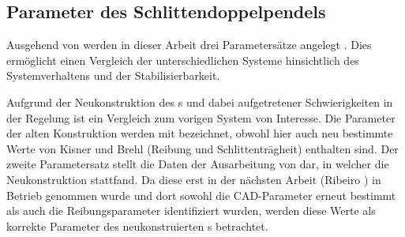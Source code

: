 \subsection{Parameter des Schlittendoppelpendels}\label{subsec:spdparams}

Ausgehend von  werden in dieser Arbeit drei Parametersätze angelegt .
Dies ermöglicht einen Vergleich der unterschiedlichen Systeme hinsichtlich des Systemverhaltens und der Stabilisierbarkeit.

Aufgrund der Neukonstruktion des \dpd s und dabei aufgetretener Schwierigkeiten in der Regelung ist ein Vergleich zum vorigen System von Interesse.
Die Parameter der alten Konstruktion werden mit  bezeichnet, obwohl hier auch neu bestimmte Werte von Kisner \cite{kisner} und Brehl \cite{brehl} (Reibung und Schlittenträgheit) enthalten sind.
Der zweite Parametersatz  stellt die Daten der Ausarbeitung von \cite{chang} dar, in welcher die Neukonstruktion stattfand. 
Da diese erst in der nächsten Arbeit (Ribeiro \cite{ribeiro}) in Betrieb genommen wurde und dort sowohl die CAD-Parameter erneut bestimmt als auch die Reibungsparameter identifiziert wurden, werden diese Werte als korrekte Parameter des neukonstruierten \dpd s betrachtet.

